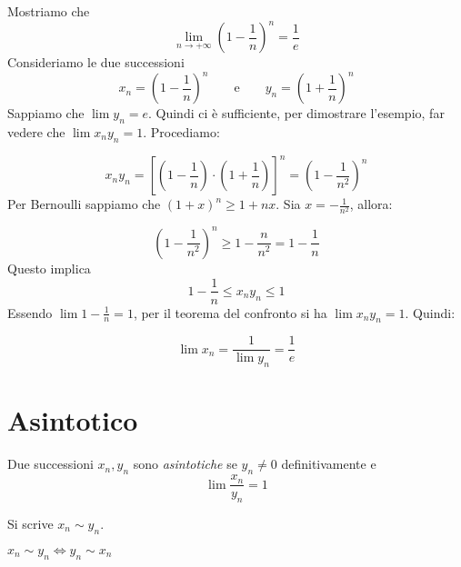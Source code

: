 \begin{example}
Mostriamo che 
\begin{equation*}
\lim_{n \to +\infty} \left(1-\frac{1}{n} \right)^n = \frac{1}{e}
\end{equation*}
Consideriamo le due successioni
\begin{equation*}
x_n = \left(1-\frac{1}{n} \right)^n \qquad \text{e} \qquad y_n = \left(1+\frac{1}{n} \right)^n
\end{equation*}
Sappiamo che $\lim y_n = e$. Quindi ci è sufficiente, per dimostrare l'esempio, far vedere che $\lim x_n y_n = 1$. Procediamo:

\begin{equation*}
x_ny_n = \left[\left(1-\frac{1}{n}\right) \cdot \left(1+\frac{1}{n}\right) \right]^n = \left(1-\frac{1}{n^2}\right)^n
\end{equation*}
Per Bernoulli sappiamo che $(1+x)^n \ge 1 + nx$. Sia $x = -\frac{1}{n^2}$, allora:

\begin{equation*}
\left(1-\frac{1}{n^2}\right)^n \ge 1 - \frac{n}{n^2} = 1 - \frac{1}{n}
\end{equation*}
Questo implica
\begin{equation*}
1 - \frac{1}{n} \le x_ny_n \le 1
\end{equation*}
Essendo $\lim 1 - \frac{1}{n} = 1$, per il teorema del confronto si ha $\lim x_ny_n =1$. Quindi:

\begin{equation*}
\lim x_n = \frac{1}{\lim y_n} = \frac{1}{e}
\end{equation*}

\end{example}

\section{Asintotico}
\begin{definition}
Due successioni $x_n, y_n$ sono \emph{asintotiche} se $y_n \neq 0$ definitivamente e
\begin{equation*}
\lim \frac{x_n}{y_n} = 1
\end{equation*}

Si scrive $x_n \sim y_n$.
\end{definition}

\begin{remark}
$x_n \sim y_n \iff y_n \sim x_n$
\end{remark}


